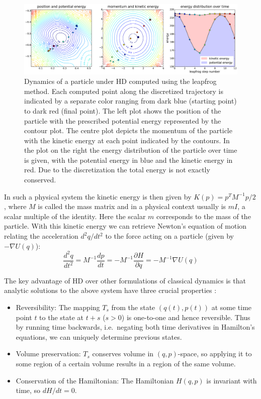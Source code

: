 \begin{figure}
\centering
\includegraphics[width=2.05\columnwidth]{figures/hmc_motion_1hmc_12lf.pdf}
\caption{Dynamics of a particle under HD computed using the leapfrog method. Each computed point along the discretized trajectory is indicated by a separate color ranging from dark blue (starting point) to dark red (final point). The left plot shows the position of the particle with the prescribed potential energy represented by the contour plot. The centre plot depicts the momentum of the particle with the kinetic energy at each point indicated by the contours. In the plot on the right the energy distribution of the particle over time is given, with the potential energy in blue and the kinetic energy in red. Due to the discretization the total energy is not exactly conserved.}
\label{fig:HMC_MOTION_1hmc_12lf}
\end{figure}

In such a physical system the kinetic energy is then given by $K(p) = p^T M^{-1} p /2$, where $M$ is called the mass matrix and in a physical context usually is $m I$, a scalar multiple of the identity. Here the scalar $m$ corresponds to the mass of the particle. With this kinetic energy we can retrieve Newton's equation of motion relating the acceleration $d^2q/dt^2$ to the force acting on a particle (given by $-\nabla U(q)$):
\begin{equation} \label{eq:NewtonsEquation}
\frac{d^2q}{dt^2} = M^{-1} \frac{dp}{dt} = - M^{-1} \frac{\partial H}{\partial q} = - M^{-1} \nabla U(q)
\end{equation}

The key advantage of HD over other formulations of classical dynamics is that analytic solutions to the above system have three crucial properties \parencite{Neal2011}:
\begin{itemize}
\item Reversibility: The mapping $T_s$ from the state $(q(t), p(t))$ at some time point $t$ to the state at $t+s$ ($s > 0$) is one-to-one and hence reversible. Thus by running time backwards, i.e.\ negating both time derivatives in Hamilton's equations, we can uniquely determine previous states.
\item Volume preservation: $T_s$ conserves volume in $(q, p)$-space, so applying it to some region of a certain volume results in a region of the same volume.
\item Conservation of the Hamiltonian: The Hamiltonian $H(q, p)$ is invariant with time, so $dH/dt = 0$.
\end{itemize}

